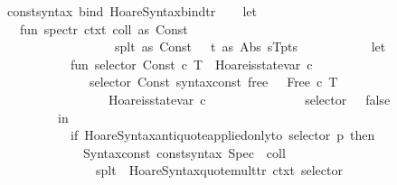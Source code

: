 \begin{isabellebody}
\ \ {\isacharparenleft}{\isacharat}{\isacharbraceleft}const{\isacharunderscore}syntax\ bind{\isacharbraceright}{\isacharcomma}\ Hoare{\isacharunderscore}Syntax{\isachardot}bind{\isacharunderscore}tr{\isacharprime}{\isacharparenright}{\isacharbrackright}\isanewline
{\isacartoucheclose}\isanewline
\isanewline
\isanewline
{}\isamarkupfalse%
\ {\isacartoucheopen}\isanewline
\ \ let\isanewline
\ \ \ \ fun\ spec{\isacharunderscore}tr{\isacharprime}\ ctxt\ {\isacharparenleft}{\isacharparenleft}coll\ as\ Const\ {\isacharunderscore}{\isacharparenright}{\isachardollar}\isanewline
\ \ \ \ \ \ \ \ \ \ \ \ \ \ \ \ \ \ \ {\isacharparenleft}{\isacharparenleft}splt\ as\ Const\ {\isacharunderscore}{\isacharparenright}\ {\isachardollar}\ {\isacharparenleft}t\ as\ {\isacharparenleft}Abs\ {\isacharparenleft}s{\isacharcomma}T{\isacharcomma}p{\isacharparenright}{\isacharparenright}{\isacharparenright}{\isacharparenright}{\isacharcolon}{\isacharcolon}ts{\isacharparenright}\ {\isacharequal}\isanewline
\ \ \ \ \ \ \ \ \ \ let\isanewline
\ \ \ \ \ \ \ \ \ \ \ \ fun\ selector\ {\isacharparenleft}Const\ {\isacharparenleft}c{\isacharcomma}\ T{\isacharparenright}{\isacharparenright}\ {\isacharequal}\ Hoare{\isachardot}is{\isacharunderscore}state{\isacharunderscore}var\ c\isanewline
\ \ \ \ \ \ \ \ \ \ \ \ \ \ {\isacharbar}\ selector\ {\isacharparenleft}Const\ {\isacharparenleft}{\isacharat}{\isacharbraceleft}syntax{\isacharunderscore}const\ {\isachardoublequote}{\isacharunderscore}free{\isachardoublequote}{\isacharbraceright}{\isacharcomma}\ {\isacharunderscore}{\isacharparenright}\ {\isachardollar}\ {\isacharparenleft}Free\ {\isacharparenleft}c{\isacharcomma}\ T{\isacharparenright}{\isacharparenright}{\isacharparenright}\ {\isacharequal}\isanewline
\ \ \ \ \ \ \ \ \ \ \ \ \ \ \ \ \ \ Hoare{\isachardot}is{\isacharunderscore}state{\isacharunderscore}var\ c\isanewline
\ \ \ \ \ \ \ \ \ \ \ \ \ \ {\isacharbar}\ selector\ {\isacharunderscore}\ {\isacharequal}\ false{\isacharsemicolon}\isanewline
\ \ \ \ \ \ \ \ \ \ in\isanewline
\ \ \ \ \ \ \ \ \ \ \ \ if\ Hoare{\isacharunderscore}Syntax{\isachardot}antiquote{\isacharunderscore}applied{\isacharunderscore}only{\isacharunderscore}to\ selector\ p\ then\isanewline
\ \ \ \ \ \ \ \ \ \ \ \ \ \ Syntax{\isachardot}const\ {\isacharat}{\isacharbraceleft}const{\isacharunderscore}syntax\ Spec{\isacharbraceright}\ {\isachardollar}\ coll\ {\isachardollar}\isanewline
\ \ \ \ \ \ \ \ \ \ \ \ \ \ \ \ {\isacharparenleft}splt\ {\isachardollar}\ Hoare{\isacharunderscore}Syntax{\isachardot}quote{\isacharunderscore}mult{\isacharunderscore}tr{\isacharprime}\ ctxt\ selector\isanewline

\end{isabellebody}
